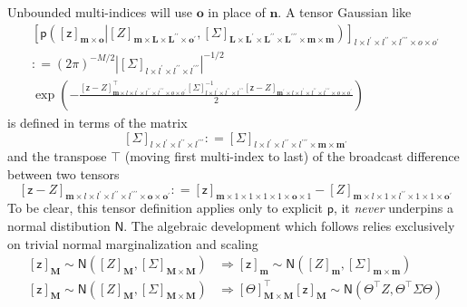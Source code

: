 \documentclass[preprint,12pt]{elsarticle}
\newcommand*{\M}[1]{\ensuremath{#1}\xspace}
\newcommand*{\x}{\times}
\newcommand*{\mi}[1]{\mathbf{#1}}
\newcommand*{\rv}[1]{\mathsf{#1}}
\newcommand*{\te}[2][]{\left\lbrack{#2}\right\rbrack_{#1}}
\newcommand*{\prob}[3]{\M{\mathsf{p}\!\left(\left.{#1}\right\vert{#2,#3}\right)}}
\newcommand*{\deq}{\M{\mathrel{\mathop:}=}}
\newcommand*{\gauss}[2]{\mathsf{N}\!\left({#1,#2}\right)}
\newcommand*{\modulus}[1]{\M{\left\lvert{#1}\right\rvert}}
\begin{document}
        Unbounded multi-indices will use $\mi{o}$ in place of $\mi{n}$.
        A tensor Gaussian like
        \begin{multline} \label{def:Notation:p}
            \te[l\x l^{\prime} \x l^{\prime\prime} \x l^{\prime\prime\prime} \x o\x o^{\prime}]{\prob{\te[\mi{m}\x\mi{o}]{\rv{z}}}{\te[\mi{m}\x\mi{L}\x\mi{L^{\prime\prime}}\x\mi{o^{\prime}}]{Z}}{\te[\mi{L}\x\mi{L^{\prime}}\x\mi{L^{\prime\prime}}\x\mi{L^{\prime\prime\prime}}\x\mi{m}\x\mi{m}]{\Sigma}}} \\
            \deq (2 \pi)^{-M/2} \modulus{\te[l\x l^{\prime} \x l^{\prime\prime} \x l^{\prime\prime\prime}]{\Sigma}}^{-1/2} \\
            \exp\left(-\frac{
                \te[\mi{m}\x l\x l^{\prime} \x l^{\prime\prime} \x l^{\prime\prime\prime} \x o\x o^{\prime}]{\rv{z}-Z}^{\intercal} 
            \te[l\x l^{\prime} \x l^{\prime\prime} \x l^{\prime\prime\prime}]{\Sigma}^{-1} 
            \te[\mi{m^{\prime}}\x l\x l^{\prime} \x l^{\prime\prime} \x l^{\prime\prime\prime} \x o\x o^{\prime}]{\rv{z}-Z}}
            {2}\right)
        \end{multline}
        is defined in terms of the matrix
        \begin{equation*}
            \te[l\x l^{\prime} \x l^{\prime\prime} \x l^{\prime\prime\prime}]{\Sigma} \deq
            \te[l\x l^{\prime} \x l^{\prime\prime} \x l^{\prime\prime\prime}\x\mi{m}\x\mi{m^{\prime}}]{\Sigma}
        \end{equation*}
        and the transpose ${\intercal}$ (moving first multi-index to last) of the broadcast difference between two tensors
        \begin{equation*}
            \te[\mi{m}\x l\x l^{\prime} \x l^{\prime\prime} \x l^{\prime\prime\prime} \x \mi{o}\x \mi{o^{\prime}}]{\rv{z} - Z}
            \deq \te[\mi{m}\x 1\x 1\x 1\x 1\x\mi{o}\x 1]{\rv{z}} - \te[\mi{m}\x l\x 1\x l^{\prime\prime}\x 1\x 1\x\mi{o^{\prime}}]{Z}
        \end{equation*}
        To be clear, this tensor definition applies only to explicit $\mathsf{p}$, it \emph{never} underpins a normal distibution $\mathsf{N}$. 
        The algebraic development which follows relies exclusively on trivial normal marginalization and scaling
        \begin{equation} \label{eq:Notation:marginalization}
            \begin{aligned}
                \te[\mi{M}]{\rv{z}} \sim \gauss{\te[\mi{M}]{Z}}{\te[\mi{M}\x\mi{M}]{\Sigma}} &\Rightarrow
                \te[\mi{m}]{\rv{z}} \sim \gauss{\te[\mi{m}]{Z}}{\te[\mi{m}\x\mi{m}]{\Sigma}} \\
                \te[\mi{M}]{\rv{z}} \sim \gauss{\te[\mi{M}]{Z}}{\te[\mi{M}\x\mi{M}]{\Sigma}} &\Rightarrow
                \te[\mi{M}\x\mi{M}]{\Theta}^{\intercal}\te[\mi{M}]{\rv{z}} \sim \gauss{\Theta^{\intercal}Z}{\Theta^{\intercal}\Sigma\Theta}                        
            \end{aligned}
        \end{equation}
\end{document}
